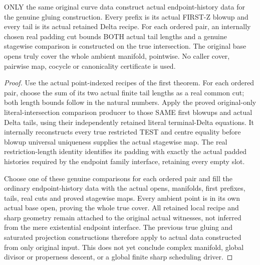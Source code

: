 \begin{theorem}
\label{hir:sharp-actual-original-endpoint-comparison-atlas}
\leanok
{}
ONLY the same original curve data construct actual endpoint-history data for
the genuine gluing construction. Every prefix is its actual FIRST-Z blowup
and every tail is its actual retained Delta recipe. For each ordered pair,
an internally chosen real padding cut bounds BOTH actual tail lengths and
a genuine stagewise comparison is constructed on the true intersection.
The original base opens truly cover the whole ambient manifold, pointwise.
No caller cover, pairwise map, cocycle or canonicality certificate is used.
\end{theorem}
\begin{proof}
Use the actual point-indexed recipes of the first theorem. For each ordered
pair, choose the sum of its two actual finite tail lengths as a real common
cut; both length bounds follow in the natural numbers. Apply the proved
original-only literal-intersection comparison producer to those SAME first
blowups and actual Delta tails, using their independently retained literal
terminal-Delta equations. It internally reconstructs every true restricted
TEST and centre equality before blowup universal uniqueness supplies the
actual stagewise map. The real restriction-length identity identifies its
padding with exactly the actual padded histories required by the endpoint
family interface, retaining every empty slot.

Choose one of these genuine comparisons for each ordered pair and fill the
ordinary endpoint-history data with the actual opens, manifolds, first
prefixes, tails, real cuts and proved stagewise maps. Every ambient point is
in its own actual base open, proving the whole true cover. All retained
local recipe and sharp geometry remain attached to the original actual
witnesses, not inferred from the mere existential endpoint interface. The
previous true gluing and saturated projection constructions therefore apply
to actual data constructed from only original input. This does not yet
conclude complex manifold, global divisor or properness descent, or a global
finite sharp scheduling driver.
\end{proof}
